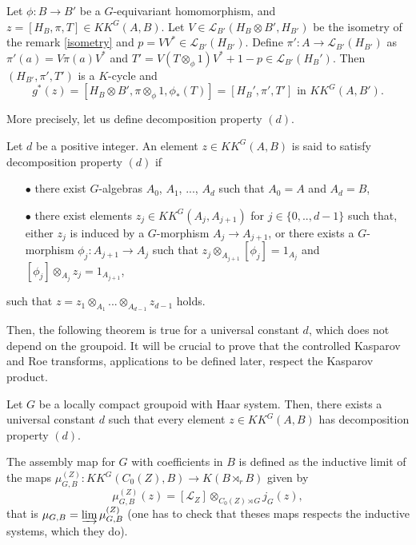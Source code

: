 \begin{lem}\label{isometryKK}
Let $\phi : B\rightarrow B'$ be a $G$-equivariant homomorphism, and $z=[H_B,\pi, T]\in KK^G(A,B)$. Let $V\in\mathcal L_{B'}(H_B\otimes B', H_{B'})$ be the isometry of the remark \ref{isometry} and $p = VV^*\in\mathcal L_{B'}(H_{B'})$. Define $\pi' : A\rightarrow \mathcal L_{B'}(H_{B'})$ as $\pi'(a) = V\pi(a)V^*$ and $T'= V(T\otimes_\phi 1)V^* + 1-p \in \mathcal L_{B'}(H_B')$. Then $(H_{B'},\pi',T')$ is a $K$-cycle and 
\[g^*(z) = [H_B\otimes B',\pi\otimes_\phi 1,\phi_*(T)]=[H_B', \pi', T']\text{ in } KK^G(A,B').\]
\end{lem} 

More precisely, let us define decomposition property $(d)$.

\begin{definition}\label{DecompositionPropertyD}
Let $d$ be a positive integer. An element $z\in KK^G(A,B)$ is said to satisfy decomposition property $(d)$ if
\begin{itemize}
\item[$\bullet$] there exist $G$-algebras $A_0$, $A_1$, ..., $A_d$ such that $A_0=A$ and $A_d=B$, 
\item[$\bullet$] there exist elements $z_j \in KK^G(A_{j},A_{j+1})$ for $j\in\{0,..,d-1\}$ such that, either $z_j$ is induced by a $G$-morphism $A_j \rightarrow A_{j+1}$, or there exists a $G$-morphism $\phi_j : A_{j+1}\rightarrow A_j$ such that $z_j \otimes_{A_{j+1}} [\phi_j] = 1_{A_j}$ and $ [\phi_j] \otimes_{A_{j}} z_j  = 1_{A_{j+1}}$,
\end{itemize}
such that $z = z_1 \otimes_{A_1}  ... \otimes_{A_{d-1}} z_{d-1} $ holds.
\end{definition}

Then, the following theorem is true for a universal constant $d$, which does not depend on the groupoid. It will be crucial to prove that the controlled Kasparov and Roe transforms, applications to be defined later, respect the Kasparov product. 

\begin{thm}\label{propertyD}
Let $G$ be a locally compact groupoid with Haar system. Then, there exists a universal constant $d$ such that every element $z\in KK^G(A,B)$ has decomposition property $(d)$.
\end{thm}

\begin{definition}
The assembly map for $G$ with coefficients in $B$ is defined as the inductive limit of the maps $\mu_{G,B}^{(Z)} : KK^G(C_0(Z),B)\rightarrow K(B\rtimes_r B)$ given by
\[\mu_{G,B}^{(Z)} (z)=[\mathcal L_Z]\otimes_{C_0(Z)\rtimes G} j_G(z),\]
that is $\mu_{G,B} = \varinjlim \mu_{G,B}^{(Z)}$ (one has to check that theses maps respects the inductive systems, which they do).\\
\end{definition}


